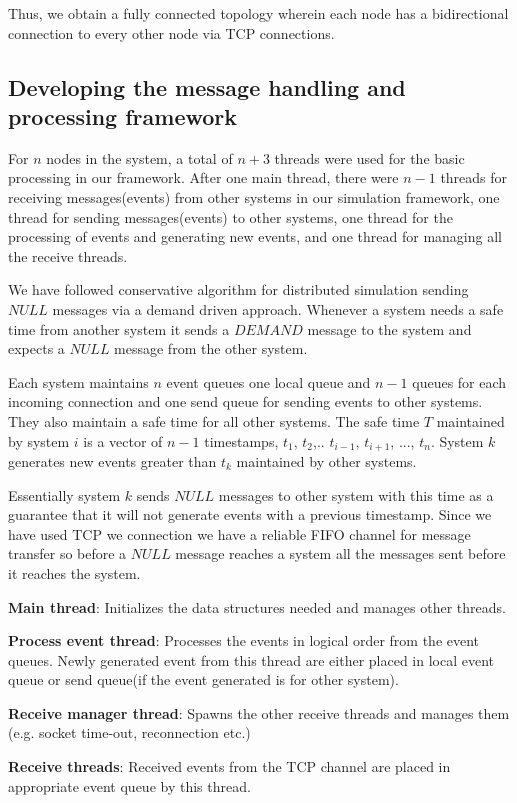 \documentclass[12pt,a4paper]{article}
\begin{document}
Thus, we obtain a fully connected topology wherein each node has a bidirectional connection to every other node via TCP connections.
	\subsection{Developing the message handling and processing framework}
For $n$ nodes in the system, a total of $n+3$ threads were used for the basic processing in our framework. After one main thread, there were $n-1$ threads for receiving messages(events) from other systems in our simulation framework, one thread for sending messages(events) to other systems, one thread for the processing of events and generating new events, and one thread for managing all the receive threads.

We have followed conservative algorithm for distributed simulation sending $NULL$ messages via a demand driven approach. Whenever a system needs a safe time from another system it sends a $DEMAND$ message to the system and expects a $NULL$ message from the other system.

Each system maintains $n$ event queues one local queue and $n-1$ queues for each incoming connection and one send queue for sending events to other systems. They also maintain a safe time for all other systems. The safe time $T$ maintained by system $i$ is a vector of $n-1$ timestamps, $t_1$, $t_2$,.. $t_{i-1}$, $t_{i+1}$, ..., $t_n$. System $k$ generates new events greater than $t_k$ maintained by other systems.

Essentially system $k$ sends $NULL$ messages to other system with this time as a guarantee that it will not generate events with a previous timestamp. Since we have used TCP we connection we have a reliable FIFO channel for message transfer so before a $NULL$ message reaches a system all the messages sent before it reaches the system.

\textbf{Main thread}: Initializes the data structures needed and manages other threads.

\textbf{Process event thread}: Processes the events in logical order from the event queues. Newly generated event from this thread are either placed in local event queue or send queue(if the event generated is for other system).

\textbf{Receive manager thread}: Spawns the other receive threads and manages them (e.g. socket time-out, reconnection etc.)

\textbf{Receive threads}: Received events from the TCP channel are placed in appropriate event queue by this thread.
\end{document}
